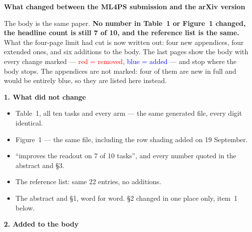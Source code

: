\documentclass[10pt]{article}
\newcommand{\old}[1]{\textcolor{red}{#1}}
\newcommand{\new}[1]{\textcolor{blue}{#1}}
\begin{document}
{\large\textbf{What changed between the ML4PS submission and the arXiv version}}

The body is the same paper. \textbf{No number in Table~1 or Figure~1 changed, the headline count is
still 7 of 10, and the reference list is the same.} What the four-page limit had cut is now written
out: four new appendices, four extended ones, and six additions to the body. The last pages show the
body with every change marked --- \old{red = removed}, \new{blue = added} --- and stop where the body
stops. The appendices are not marked: four of them are new in full and would be entirely blue, so
they are listed here instead.

\textbf{1. What did not change}

\begin{itemize}[leftmargin=*, itemsep=2pt]
\item Table~1, all ten tasks and every arm --- the same generated file, every digit identical.
\item Figure~1 --- the same file, including the row shading added on 19 September.
\item ``improves the readout on 7 of 10 tasks'', and every number quoted in the abstract and \S3.
\item The reference list: same 22 entries, no additions.
\item The abstract and \S1, word for word. \S2 changed in one place only, item~1 below.
\end{itemize}

\textbf{2. Added to the body}
\end{document}
